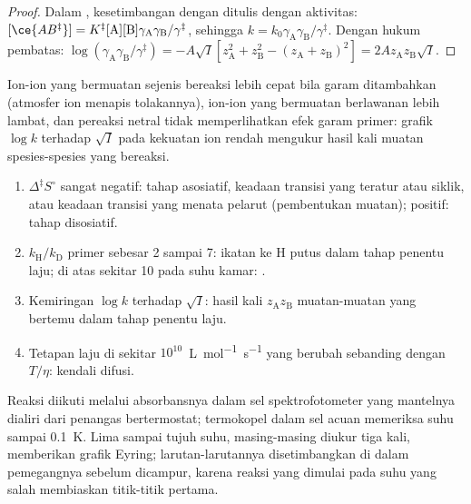 \begin{proof}
Dalam , kesetimbangan dengan  ditulis
dengan aktivitas:
$[\ce{AB^{\ddagger}}] = K^{\ddagger}[\mathrm A][\mathrm B]\gamma_{\mathrm A}\gamma_{\mathrm B}/\gamma^{\ddagger}$, sehingga
$k = k_0\gamma_{\mathrm A}\gamma_{\mathrm B}/\gamma^{\ddagger}$. Dengan hukum pembatas:
$\log(\gamma_{\mathrm A}\gamma_{\mathrm B}/\gamma^{\ddagger}) = -A\sqrt I[z_{\mathrm A}^2 + z_{\mathrm B}^2 - (z_{\mathrm A} + z_{\mathrm B})^2] =
2Az_{\mathrm A}z_{\mathrm B}\sqrt I$.
\end{proof}

Ion-ion yang bermuatan sejenis bereaksi lebih cepat bila garam ditambahkan
(atmosfer ion menapis tolakannya), ion-ion yang bermuatan berlawanan lebih
lambat, dan pereaksi netral tidak memperlihatkan efek garam primer: grafik
$\log k$ terhadap $\sqrt I$ pada kekuatan ion rendah mengukur hasil kali muatan
spesies-spesies yang bereaksi.

\begin{method}\label{met:b3:rate-theories:mechanism-evidence}
\begin{enumerate}
  \item $\Delta^{\ddagger}S^\circ$ sangat negatif: tahap asosiatif, keadaan transisi
        yang teratur atau siklik, atau keadaan transisi yang menata pelarut
        (pembentukan muatan); positif: tahap disosiatif.
  \item $k_{\mathrm H}/k_{\mathrm D}$ primer sebesar 2 sampai 7: ikatan ke H putus dalam
        tahap penentu laju; di atas sekitar 10 pada suhu kamar: .
  \item Kemiringan $\log k$ terhadap $\sqrt I$: hasil kali $z_{\mathrm A}z_{\mathrm B}$
        muatan-muatan yang bertemu dalam tahap penentu laju.
  \item Tetapan laju di sekitar $10^{10}$~\unit{L.mol^{-1}.s^{-1}} yang berubah
        sebanding dengan $T/\eta$: kendali difusi.
\end{enumerate}
\end{method}

\begin{inthelab}
Reaksi diikuti melalui absorbansnya dalam sel spektrofotometer yang mantelnya
dialiri dari penangas bertermostat; termokopel dalam sel acuan memeriksa suhu
sampai \qty{0.1}{K}. Lima sampai tujuh suhu, masing-masing diukur tiga kali,
memberikan grafik Eyring; larutan-larutannya disetimbangkan di dalam
pemegangnya sebelum dicampur, karena reaksi yang dimulai pada suhu yang salah
membiaskan titik-titik pertama.
\end{inthelab}

